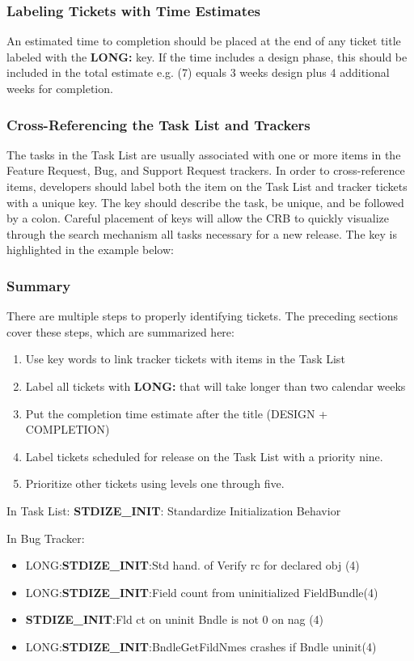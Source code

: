 \subsubsection{Labeling Tickets with Time Estimates}

An estimated time to completion should be placed at the end of any ticket title labeled with
the {\bf LONG:} key. If the time includes a design phase, this should be included in the
total estimate e.g. (7) equals 3 weeks design plus 4 additional weeks for completion.  

\subsubsection{Cross-Referencing the Task List and Trackers}

The tasks in the Task List are usually associated with
one or more items in the Feature Request, Bug, and Support Request 
trackers.  In order to cross-reference items, developers should label
both the item on the Task List and tracker tickets with a 
unique key. The key should describe the task, be unique, and be followed by a
colon. Careful placement of keys will allow the CRB to quickly visualize
through the search mechanism all tasks necessary for a new release. The key
is highlighted in the example below:

\subsubsection{Summary}
There are multiple steps to properly identifying tickets. The preceding sections
cover these steps, which are summarized here:
\begin{enumerate}
\item Use key words to link tracker tickets with items in the Task List
\item Label all tickets with {\bf LONG:} that will take longer than two calendar weeks
\item Put the completion time estimate after the title (DESIGN + COMPLETION)
\item Label tickets scheduled for release on the Task List with a priority nine.
\item Prioritize other tickets using levels one through five.
\end {enumerate}

\vspace{2mm}
In Task List: {\bf STDIZE\_INIT}: Standardize Initialization Behavior

\vspace{2mm}
In Bug Tracker:
\begin{itemize}
\item LONG:{\bf STDIZE\_INIT}:Std hand. of Verify rc for declared obj (4)
\item LONG:{\bf STDIZE\_INIT}:Field count from uninitialized FieldBundle(4)
\item {\bf STDIZE\_INIT}:Fld ct on uninit Bndle is not 0 on nag (4)
\item LONG:{\bf STDIZE\_INIT}:BndleGetFildNmes crashes if Bndle uninit(4)
\end{itemize}

